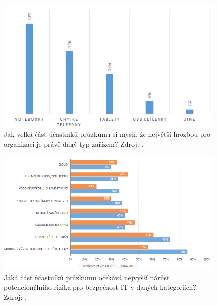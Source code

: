 \begin{figure}[h!]\label{hrozbyZarizeni}
\centering
\includegraphics[width=12cm]{img/hrozbyZarizeni}
\caption{Jak velká část účastníků průzkumu si myslí, že největší hrozbou pro organizaci je právě daný typ zařízení? Zdroj: \cite{ponemon}.} 
\end{figure}%



\begin{figure}[h!]\label{hrozbyDuvody}
\centering
\includegraphics[width=13cm]{img/hrozbyDuvody}
\caption{Jaká část účastníků průzkumu očekává nejvyšší nárůst potencionálního rizika pro bezpečnost IT v daných kategoriích? Zdroj: \cite{ponemon}.} 
\end{figure}%


